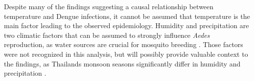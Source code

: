 Despite many of the findings suggesting a causal relationship between temperature and Dengue infections, it cannot be assumed that temperature is the main factor leading to the observed epidemiology. Humidity and precipitation are two climatic factors that can be assumed to strongly influence \emph{Aedes} reproduction, as water sources are crucial for mosquito breeding \citep{Abdullah2022} \citep{Li1985}.  Those factors were not recognized in this analysis, but will possibly provide valuable context to the findings, as Thailands monsoon seasons significantly differ in humidity and precipitation \citep{Kripalani1995}.


